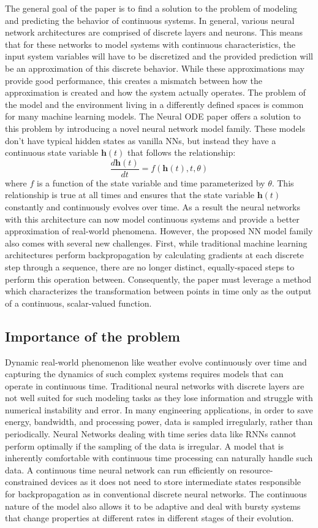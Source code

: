 \documentclass{article}
\begin{document}
The general goal of the paper is to find a solution to the problem of modeling and predicting the behavior of continuous systems. In general, various neural network architectures are comprised of discrete layers and neurons. This means that for these networks to model systems with continuous characteristics, the input system variables will have to be discretized and the provided prediction will be an approximation of this discrete behavior. While these approximations may provide good performance, this creates a mismatch between how the approximation is created and how the system actually operates. The problem of the model and the environment living in a differently defined spaces is common for many machine learning models. 
The Neural ODE paper offers a solution to this problem by introducing a novel neural network model family. These models don't have typical hidden states as vanilla NNs, but instead they have a continuous state variable \(\mathbf{h}(t)\) that follows the relationship: 
\begin{equation}
    \frac{d\mathbf{h}(t)}{dt} = f(\mathbf{h}(t), t, \theta)    
\end{equation}
where \(f\) is a function of the state variable and time parameterized by $\theta$. This relationship is true at all times and ensures that the state variable $\mathbf{h}(t)$ constantly and continuously evolves over time. As a result the neural networks with this architecture can now model continuous systems and provide a better approximation of real-world phenomena. However, the proposed NN model family also comes with several new challenges. First, while traditional machine learning architectures perform backpropagation by calculating gradients at each discrete step through a sequence, there are no longer distinct, equally-spaced steps to perform this operation between. Consequently, the paper must leverage a method which characterizes the transformation between points in time only as the output of a continuous, scalar-valued function.

\subsection{Importance of the problem}
Dynamic real-world phenomenon like weather evolve continuously over time and capturing the dynamics of such complex systems requires models that can operate in continuous time. Traditional neural networks with discrete layers are not well suited for such modeling tasks as they lose information and struggle with numerical instability and error. In many engineering applications, in order to save energy, bandwidth, and processing power, data is sampled irregularly, rather than periodically. Neural Networks dealing with time series data like RNNs cannot perform optimally if the sampling of the data is irregular. A model that is inherently comfortable with continuous time processing can naturally handle such data. A continuous time neural network can run efficiently on resource-constrained devices as it does not need to store intermediate states responsible for backpropagation as in conventional discrete neural networks. The continuous nature of the model also allows it to be adaptive and deal with bursty systems that change properties at different rates in different stages of their evolution.
\end{document}
